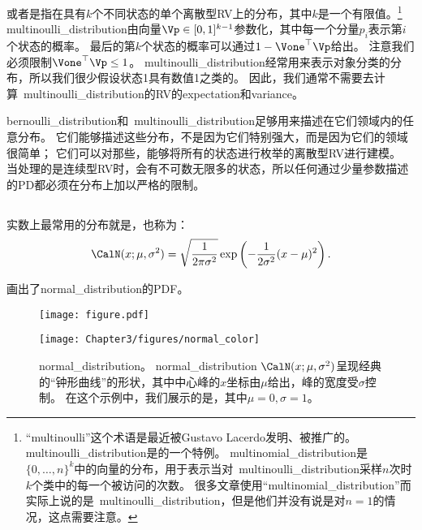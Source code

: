 或者是指在具有$k$个不同状态的单个离散型\gls{RV}上的分布，其中$k$是一个有限值。\footnote{``multinoulli''这个术语是最近被Gustavo Lacerdo发明、被\cite{MurphyBook2012}推广的。
\gls{multinoulli_distribution}是的一个特例。
\gls{multinomial_distribution}是$\{0,\ldots, n\}^k$中的向量的分布，用于表示当对~\gls{multinoulli_distribution}采样$n$次时$k$个类中的每一个被访问的次数。
很多文章使用``\gls{multinomial_distribution}''而实际上说的是~\gls{multinoulli_distribution}，但是他们并没有说是对$n=1$的情况，这点需要注意。}
\gls{multinoulli_distribution}由向量$\Vp \in [0, 1]^{k-1}$参数化，其中每一个分量$p_i$表示第$i$个状态的概率。
最后的第$k$个状态的概率可以通过$1-\Vone^\top \Vp$给出。
注意我们必须限制$\Vone^\top \Vp \le 1$。
\gls{multinoulli_distribution}经常用来表示对象分类的分布，所以我们很少假设状态1具有数值1之类的。
因此，我们通常不需要去计算~\gls{multinoulli_distribution}的\gls{RV}的\gls{expectation}和\gls{variance}。


\gls{bernoulli_distribution}和~\gls{multinoulli_distribution}足够用来描述在它们领域内的任意分布。
它们能够描述这些分布，不是因为它们特别强大，而是因为它们的领域很简单；
它们可以对那些，能够将所有的状态进行枚举的离散型\gls{RV}进行建模。
当处理的是连续型\gls{RV}时，会有不可数无限多的状态，所以任何通过少量参数描述的\gls{PD}都必须在分布上加以严格的限制。

\subsection{}
\label{sec:gaussian_distribution}


实数上最常用的分布就是，也称为：
\begin{equation}
\CalN(x; \mu, \sigma^2) = \sqrt{\frac{1}{2\pi \sigma^2}} \exp \left ( -\frac{1}{2\sigma^2} (x-\mu)^2 \right ).
\end{equation}

画出了\gls{normal_distribution}的\gls{PDF}。
\begin{figure}[!htb]
\ifOpenSource
\centerline{\texttt{[image: figure.pdf]}}
\else
\centerline{\texttt{[image: Chapter3/figures/normal\_color]}}
\fi
\captionsetup{singlelinecheck=off}
\caption[.]{\gls{normal_distribution}。
\gls{normal_distribution} $\CalN(x; \mu, \sigma^2)$呈现经典的``钟形曲线''的形状，其中中心峰的$x$坐标由$\mu$给出，峰的宽度受$\sigma$控制。
在这个示例中，我们展示的是，其中$\mu=0, \sigma = 1$。}
\label{fig:chap3_normal_color}
\end{figure}

